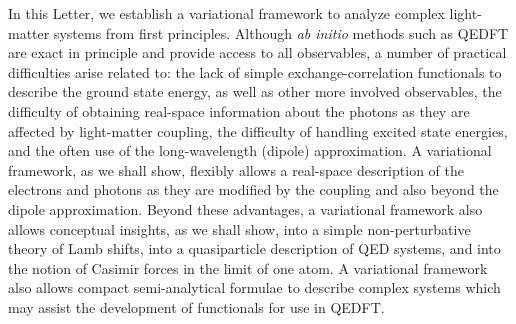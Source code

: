 \documentclass[aps,prl,twocolumn,
	groupedaddress,superscriptaddress,
	amsfonts,amssymb,amsmath,floatfix,
	citeautoscript]{revtex4-1}
\begin{document}
 In this Letter, we establish a variational framework to analyze complex light-matter systems from first principles. Although  \textit{ab initio} methods such as QEDFT are exact in principle and provide access to all observables, a number of practical difficulties arise related to: the lack of simple exchange-correlation functionals to describe the ground state energy, as well as other more involved observables, the difficulty of obtaining real-space information about the photons as they are affected by light-matter coupling, the difficulty of handling excited state energies, and the often use of the long-wavelength (dipole) approximation. A variational framework, as we shall show, flexibly allows a real-space description of the electrons and photons as they are modified by the coupling and also beyond the dipole approximation. Beyond these advantages, a variational framework also allows conceptual insights, as we shall show, into a simple non-perturbative theory of Lamb shifts, into a quasiparticle description of QED systems, and into the notion of Casimir forces in the limit of one atom. A variational framework also allows compact semi-analytical formulae to describe complex systems which may assist the development of functionals for use in QEDFT. 
\end{document}

